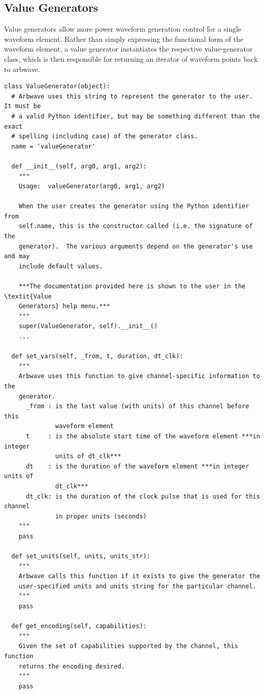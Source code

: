 \subsection{Value Generators}
Value generators allow more power waveform generation control for a single
waveform element.  Rather than simply expressing the functional form of the
waveform element, a value generator instantiates the respective value-generator
class, which is then responsible for returning an iterator of waveform points
back to arbwave.
%
\begin{lstlisting}
class ValueGenerator(object):
  # Arbwave uses this string to represent the generator to the user.  It must be
  # a valid Python identifier, but may be something different than the exact
  # spelling (including case) of the generator class.
  name = 'valueGenerator'

  def __init__(self, arg0, arg1, arg2):
    """
    Usage:  valueGenerator(arg0, arg1, arg2)

    When the user creates the generator using the Python identifier from
    self.name, this is the constructor called (i.e. the signature of the
    generator).  The various arguments depend on the generator's use and may
    include default values.

    ***The documentation provided here is shown to the user in the \textit{Value
    Generators} help menu.***
    """
    super(ValueGenerator, self).__init__()
    ...

  def set_vars(self, _from, t, duration, dt_clk):
    """
    Arbwave uses this function to give channel-specific information to the
    generator.
      _from : is the last value (with units) of this channel before this
              waveform element
      t     : is the absolute start time of the waveform element ***in integer
              units of dt_clk***
      dt    : is the duration of the waveform element ***in integer units of
              dt_clk***
      dt_clk: is the duration of the clock pulse that is used for this channel
              in proper units (seconds)
    """
    pass

  def set_units(self, units, units_str):
    """
    Arbwave calls this function if it exists to give the generator the
    user-specified units and units string for the particular channel.
    """
    pass

  def get_encoding(self, capabilities):
    """
    Given the set of capabilities supported by the channel, this function
    returns the encoding desired.
    """
    pass


\end{lstlisting}
